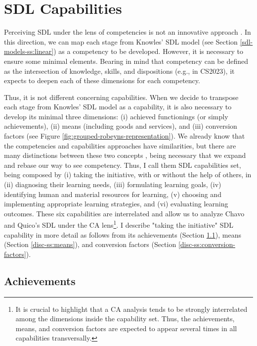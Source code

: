 \section{SDL Capabilities}
\label{disc-sec:sdl-capabilities}

Perceiving \gls{SDL} under the lens of competencies is not an innovative approach \cite{patterson:2002,morris:2019,colomer:2021}. In this direction, we can map each stage from Knowles' \gls{SDL} model (see Section \ref{sdl-models-ss:linear}) as a competency to be developed. However, it is necessary to ensure some minimal elements. Bearing in mind that competency can be defined as the intersection of knowledge, skills, and dispositions (e.g.,  in \acrshort{CS2023}), it expects to deepen each of these dimensions for each competency.

Thus, it is not different concerning capabilities. When we decide to transpose each stage from Knowles' \gls{SDL} model as a capability, it is also necessary to develop its minimal three dimensions: (i) achieved functionings (or simply achievements), (ii) means (including goods and services), and (iii) conversion factors (see Figure \ref{fig:grouped-robeyns-representation}).
We already know that the competencies and capabilities approaches have similarities, but there are many distinctions between these two concepts \cite{lozano:2012}, being necessary that we expand and rebase our way to see competency. Thus, I call them \gls{SDL} capabilities set, being composed by (i) taking the initiative, with or without the help of others, in (ii) diagnosing their learning needs, (iii) formulating learning goals, (iv) identifying human and material resources for learning, (v) choosing and implementing appropriate learning strategies, and (vi) evaluating learning outcomes. These six capabilities are interrelated and allow us to analyze Chavo and Quico’s \gls{SDL} under the \gls{CA} lens\footnote{It is crucial to highlight that a \gls{CA} analysis tends to be strongly interrelated among the dimensions inside the capability set. Thus, the achievements, means, and conversion factors are expected to appear several times in all capabilities transversally.}. I describe "taking the initiative" \gls{SDL} capability in more detail as follows from its achievements (Section \ref{disc-ss:achievements}), means (Section \ref{disc-ss:means}), and conversion factors (Section \ref{disc-ss:conversion-factors}).

\subsection{Achievements}
\label{disc-ss:achievements}

